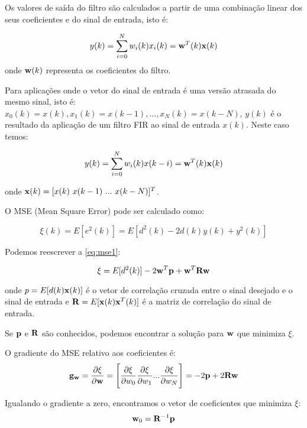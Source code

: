 Os valores de saída do filtro são calculados a partir de uma combinação linear dos seus coeficientes e do sinal de entrada, isto é:

\begin{equation}\label{eq:y}
y(k) = \sum_{i=0}^{N} w_i(k) x_i(k) = {\bf w}^T(k) {\bf x}(k)
\end{equation}
onde ${\bf w}(k)$ representa os coeficientes do filtro.

Para aplicações onde o vetor do sinal de entrada é uma versão atrasada do mesmo sinal, isto é: $x_0(k) = x(k),x_1(k) = x(k - 1),...,x_N(k) = x(k - N)$, $y(k)$ é o resultado da aplicação de um filtro FIR ao sinal de entrada $x(k)$. Neste caso temos:

\begin{equation}
y(k) = \sum_{i=0}^{N} w_i(k) x(k-i) = {\bf w}^T(k) {\bf x}(k)
\end{equation}

onde ${\bf x}(k) = [x(k) \ x(k-1) \ ... \ x(k - N)]^T$.

O  MSE (Mean Square Error) pode ser calculado como:

\begin{equation} \label{eq:mse1}
\xi(k) = E[e^2(k)] = E[d^2(k) - 2d(k)y(k) + y^2(k)]
\end{equation}

Podemos reescrever a \cref{eq:mse1}:

\begin{equation}\label{eq:mse2}
\xi = E[d^2(k)] - 2{\bf w}^T{\bf p} + {\bf w}^T {\bf Rw}
\end{equation}

onde $p = E[d(k){\bf x}(k)]$ é o vetor de correlação cruzada entre o sinal desejado e o sinal de entrada e ${\bf R} = E[{\bf x}(k){\bf x}^T(k)]$ é a matriz de correlação do sinal de entrada.

Se ${\bf p}$ e ${\bf R}$ são conhecidos, podemos encontrar a solução para ${\bf w}$ que minimiza $\xi$.

O gradiente do MSE relativo aos coeficientes é:
\begin{equation}
{\bf g_w} = \frac{\partial \xi}{\partial {\bf w}} = 
\Bigg[\frac{\partial \xi}{\partial {w_0}}
\frac{\partial \xi}{\partial {w_1}} ...
\frac{\partial \xi}{\partial {w_N}}
\Bigg] = -2{\bf p} + 2{\bf Rw}
\end{equation}

Igualando o gradiente a zero, encontramos o vetor de coeficientes que minimiza $\xi$:
\begin{equation}
{\bf w}_0 = {\bf R}^{-1}{\bf p}
\end{equation}

